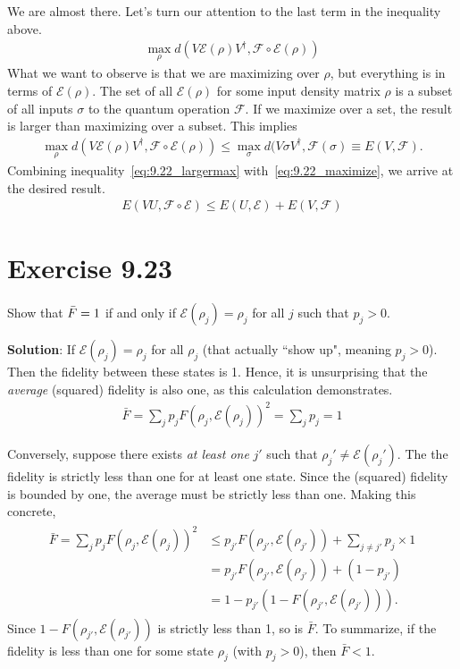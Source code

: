\documentclass{book}
\newcommand{\mc}[1]{\mathcal{#1}}
\begin{document}
    We are almost there. Let's turn our attention to the last term in the inequality above.
    \begin{align}
        \max_\rho d(V \mc{E}(\rho) V^\dagger, \mc{F}\circ\mc{E}(\rho))
    \end{align}
    What we want to observe is that we are maximizing over $\rho$, but everything is in terms of $\mc{E}(\rho)$. The set of all $\mc{E}(\rho)$ for some input density matrix $\rho$ is a subset of all inputs $\sigma$ to the quantum operation $\mc{F}$. If we maximize over a set, the result is larger than maximizing over a subset. This implies
    \begin{align} \label{eq:9.22_largermax}
        \max_\rho d(V \mc{E}(\rho) V^\dagger, \mc{F}\circ\mc{E}(\rho)) \leq \max_\sigma d(V \sigma V^\dagger, \mc{F}(\sigma) \equiv E(V, \mc{F}).
    \end{align}
    Combining inequality~\eqref{eq:9.22_largermax} with~\eqref{eq:9.22_maximize}, we arrive at the desired result.
    \begin{align}
        E(VU, \mc{F}\circ\mc{E}) \leq E(U, \mc{E}) + E(V, \mc{F})
    \end{align}

\section*{Exercise 9.23}
    Show that $\Bar{F} = 1$ if and only if $\mc{E}(\rho_j) = \rho_j$ for all $j$ such that $p_j > 0$.

    \textbf{Solution}: If $\mc{E}(\rho_j) = \rho_j$ for all $\rho_j$ (that actually ``show up", meaning $p_j > 0$). Then the fidelity between these states is 1. Hence, it is unsurprising that the \emph{average} (squared) fidelity is also one, as this calculation demonstrates.
    \begin{align}
        \bar{F} = \sum_j p_j F(\rho_j, \mc{E}(\rho_j))^2 = \sum_j p_j = 1
    \end{align}

    Conversely, suppose there exists \emph{at least one} $j'$ such that $\rho_j' \neq \mc{E}(\rho_j')$. The the fidelity is strictly less than one for at least one state. Since the (squared) fidelity is bounded by one, the average must be strictly less than one. Making this concrete,
    \begin{align}
    \begin{aligned}
        \bar{F} = \sum_j p_j F(\rho_j, \mc{E}(\rho_j))^2 &\leq p_{j'} F(\rho_{j'}, \mc{E}(\rho_{j'})) + \sum_{j\neq j'} p_j  \times 1 \\
        &= p_{j'} F(\rho_{j'}, \mc{E}(\rho_{j'})) + (1-p_{j'}) \\
        &= 1 - p_{j'}(1 - F(\rho_{j'}, \mc{E}(\rho_{j'}))).
    \end{aligned}
    \end{align}
    Since $1 - F(\rho_{j'}, \mc{E}(\rho_{j'}))$ is strictly less than 1, so is $\bar{F}$. To summarize, if the fidelity is less than one for some state $\rho_j$ (with $p_j > 0$), then $\bar{F} < 1$.
\end{document}
